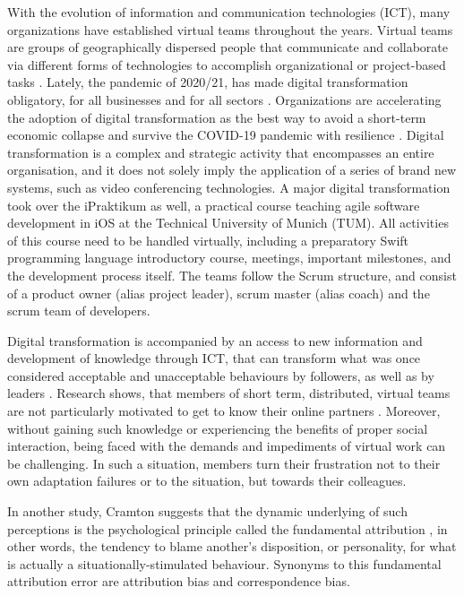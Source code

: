 With the evolution of information and communication technologies (ICT), many organizations have established virtual teams throughout the years. Virtual teams are groups of geographically dispersed people that communicate and collaborate via different forms of technologies to accomplish organizational or project-based tasks \cite{Townsed1998}. Lately, the pandemic of 2020/21, has made digital transformation obligatory, for all businesses and for all sectors \cite{Fletcher2020}. Organizations are accelerating the adoption of digital transformation as the best way to avoid a short-term economic collapse and survive the COVID-19 pandemic with resilience \cite{Pedro2020}. Digital transformation is a complex and strategic activity that encompasses an entire organisation, and it does not solely imply the application of a series of brand new systems, such as video conferencing technologies. A major digital transformation took over the iPraktikum as well, a practical course teaching agile software development in iOS at the Technical University of Munich (TUM). All activities of this course need to be handled virtually, including a preparatory Swift programming language introductory course, meetings, important milestones, and the development process itself. The teams follow the Scrum structure, and consist of a product owner (alias project leader), scrum master (alias coach) and the scrum team of developers.

Digital transformation is accompanied by an access to new information and development of knowledge through ICT, that can transform what was once considered acceptable and unacceptable behaviours by followers, as well as by leaders \cite{Avolio2000}. Research shows, that members of short term, distributed, virtual teams are not particularly motivated to get to know their online partners \cite{Walther2002}. Moreover, without gaining such knowledge or experiencing the benefits of proper social interaction, being faced with the demands and impediments of virtual work can be challenging. In such a situation, members turn their frustration not to their own adaptation failures or to the situation, but towards their colleagues.  

In another study, Cramton \cite{Cramton2001} suggests that the dynamic underlying of such perceptions is the psychological principle called the fundamental attribution \cite{Tidwell2002}, in other words, the tendency to blame another's disposition, or personality, for what is actually a situationally-stimulated behaviour. Synonyms to this fundamental attribution error are attribution bias and correspondence bias.

